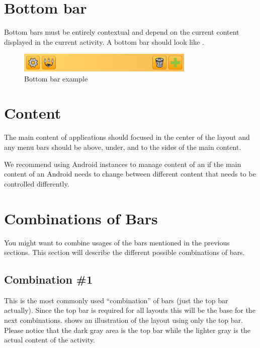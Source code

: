 \FloatBarrier


\section{Bottom bar}
Bottom bars must be entirely contextual and depend on the current content displayed in the current activity. A bottom bar should look like .


\begin{note}
\end{note}

\begin{figure}[!htbp]
    \centering
    \includegraphics[width=0.75\textwidth]{pictures/application_structure/bottombar}
    \caption{Bottom bar example}
    \label{fig:bottom_bar_example}
\end{figure}

\FloatBarrier


\section{Content}
The main content of applications should focused in the center of the layout and any menu bars should be above, under, and to the sides of the main content. 

\begin{note}
We recommend using Android  instances to manage content of an  if the main content of an Android  needs to change between different content that needs to be controlled differently. 
\end{note}
\FloatBarrier

\section{Combinations of Bars}
You might want to combine usages of the bars mentioned in the previous sections. This section will describe the different possible combinations of bars.

\subsection{Combination \#1}
This is the most commonly used ``combination'' of bars (just the top bar actually). Since the top bar is required for all layouts this will be the base for the next combinations.  shows an illustration of the layout using only the top bar. Please notice that the dark gray area is the top bar while the lighter gray is the actual content of the activity.

